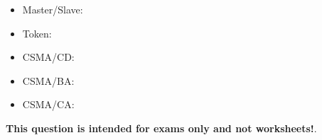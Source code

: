 
\begin{itemize}
\item{} Master/Slave: 
\vskip 10pt
\item{} Token: 
\vskip 10pt
\item{} CSMA/CD: 
\vskip 10pt
\item{} CSMA/BA: 
\vskip 10pt
\item{} CSMA/CA: 
\end{itemize}







{\bf This question is intended for exams only and not worksheets!}.



